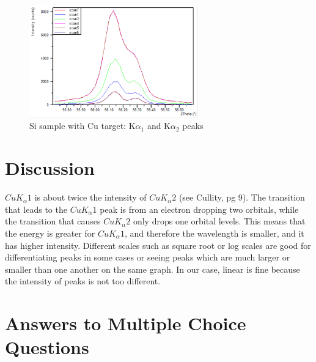 \documentclass{article}
\begin{document}
\begin{figure}[h]
\begin{center}
\includegraphics[width=0.65\textwidth]{lindamaggietutorial1} %
\caption{Si sample with Cu target: K$\alpha_1$ and K$\alpha_2$ peaks }
\end{center}
\end{figure}


\section{Discussion}
$CuK_\alpha1$ is about twice the intensity of $CuK_\alpha2$ (see Cullity, pg 9). The transition that leads to the $CuK_\alpha1$ peak is from an electron dropping two orbitals, while the transition that causes $CuK_\alpha2$ only drops one orbital levels. This means that the energy is greater for $CuK_\alpha1$, and therefore the wavelength is smaller, and it has higher intensity. Different scales such as square root or log scales are good for differentiating peaks in some cases or seeing peaks which are much larger or smaller than one another on the same graph. In our case, linear is fine because the intensity of peaks is not too different. 




\section{Answers to Multiple Choice Questions}
\end{document}

